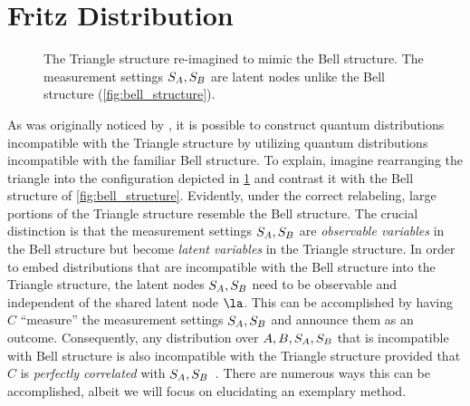 \documentclass[aps, 10pt, english, twoside, pra, nofootinbib, tightenlines, longbibliography, superscriptaddress]{revtex4-1}
\begin{document}
    \section{Fritz Distribution}
    \label{sec:fritz_distribution}
    \begin{figure}
    \begin{nscenter}
        \scalebox{1.0}{}
        \caption{The Triangle structure re-imagined to mimic the Bell structure. The measurement settings $S_{A},S_{B}$ are latent nodes unlike the Bell structure (\cref{fig:bell_structure}).}
        \label{fig:triangle_structure_with_fritz_bell_embedded}
    \end{nscenter}
    \end{figure}

    As was originally noticed by \citet{Fritz_2012}, it is possible to construct quantum distributions incompatible with the Triangle structure by utilizing quantum distributions incompatible with the familiar Bell structure. To explain, imagine rearranging the triangle into the configuration depicted in \cref{fig:triangle_structure_with_fritz_bell_embedded} and contrast it with the Bell structure of \cref{fig:bell_structure}. Evidently, under the correct relabeling, large portions of the Triangle structure resemble the Bell structure. The crucial distinction is that the measurement settings $S_{A}, S_{B}$ are \textit{observable variables} in the Bell structure but become \textit{latent variables} in the Triangle structure. In order to embed distributions that are incompatible with the Bell structure into the Triangle structure, the latent nodes $S_{A}, S_{B}$ need to be observable and independent of the shared latent node $\la$. This can be accomplished by having $C$ ``measure'' the measurement settings $S_{A}, S_{B}$ and announce them as an outcome. Consequently, any distribution over $A, B, S_{A}, S_{B}$ that is incompatible with Bell structure is also incompatible with the Triangle structure provided that $C$ is \textit{perfectly correlated} with $S_{A}, S_{B}$~\cite{Fritz_2012}. There are numerous ways this can be accomplished, albeit we will focus on elucidating an exemplary method.
\end{document}
